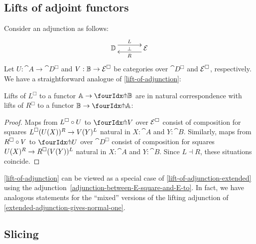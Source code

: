 \documentclass[reqno,10pt,a4paper,oneside]{amsart}
\begin{document}
\subsection{Lifts of adjoint functors}

Consider an adjunction as follows:
\[
\xymatrix@C+1em{
  \cat{D}
  \ar@<5pt>[r]^{L}
  \ar@{}[r]|{\bot}
&
  \catE
  \ar@<5pt>[l]^{R}
}
\]
Let $U : \cat{A} \to \cat{D}^{\Box}$ and $V : \mathbb{B} \to \mathcal{E}^{\Box}$ be categories over $\cat{D}^{\Box}$ and $\mathcal{E}^{\Box}$, respectively.
We have a straightforward analogue of \cref{lift-of-adjunction}:

\begin{lemma}
\label{lift-of-adjunction-extended}
Lifts of $L^{\Box}$ to a functor $\cat{A} \to \liftl{\cat{B}}$ are in natural correspondence with lifts of $R^{\Box}$ to a functor $\cat{B} \to \liftr{\cat{A}}$:
\end{lemma}

\begin{proof}
Maps from $L^{\Box} \mathbin{\circ} U$ to $\liftl{V}$ over $\mathcal{E}^{\Box}$ consist of composition for squares $L^{\Box}(U(X)){}^R \to V(Y){}^L$ natural in $X : \cat{A}$ and $Y : \cat{B}$.
Similarly, maps from $R^{\Box} \mathbin{\circ} V$ to $\liftr{U}$ over $\cat{D}^{\Box}$ consist of composition for squares $U(X){}^R \to R^{\Box}(V(Y)){}^L$ natural in $X : \cat{A}$ and $Y : \cat{B}$.
Since $L \dashv R$, these situations coincide.
\end{proof}

\begin{remark}
\label{lift-of-adjunction-mixed}
\cref{lift-of-adjunction} can be viewed as a special case of \cref{lift-of-adjunction-extended} using the adjunction~\eqref{adjunction-between-E-square-and-E-to}.
In fact, we have analogous statements for the ``mixed'' versions of the lifting adjunction of \cref{extended-adjunction-gives-normal-one}.
\end{remark}

\subsection{Slicing}
\end{document}
